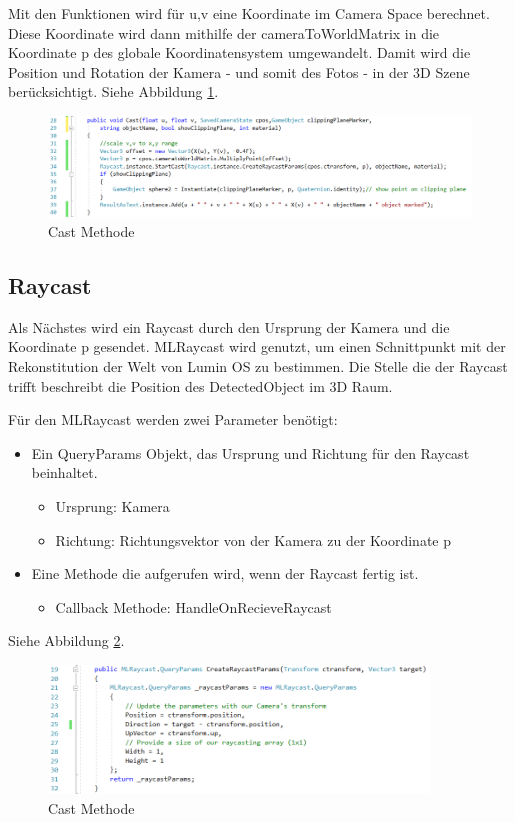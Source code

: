 \documentclass[german,a4paper, 12pt]{llncs}
\begin{document}
Mit den Funktionen wird für u,v eine Koordinate im Camera Space berechnet. Diese Koordinate wird dann mithilfe der cameraToWorldMatrix in die Koordinate p des globale Koordinatensystem umgewandelt. Damit wird die Position und Rotation der Kamera - und somit des Fotos - in der 3D Szene berücksichtigt. Siehe Abbildung \ref{code:castmethod}.

\begin{figure}[H]
	\centering
	\includegraphics[width=1.2\textwidth]{images/code_cast_method.PNG}
	\caption[]{Cast Methode}
	\label{code:castmethod}
\end{figure}
\subsection{Raycast}

Als Nächstes wird ein Raycast durch den Ursprung der Kamera und die Koordinate p gesendet. MLRaycast wird genutzt, um einen Schnittpunkt mit der Rekonstitution der Welt von Lumin OS zu bestimmen. Die Stelle die der Raycast trifft beschreibt die Position des DetectedObject im 3D Raum.

Für den MLRaycast werden zwei Parameter benötigt:
\begin{itemize}
	\item Ein QueryParams Objekt, das Ursprung und Richtung für den Raycast beinhaltet.
	\begin{itemize}
		\item Ursprung: Kamera
		\item Richtung: Richtungsvektor von der Kamera zu der Koordinate p
	\end{itemize}
	\item Eine Methode die aufgerufen wird, wenn der Raycast fertig ist. 
		\begin{itemize}
		\item Callback Methode: HandleOnRecieveRaycast
	\end{itemize}
\end{itemize}

Siehe Abbildung \ref{code:raycastparams}.

\begin{figure}[H]
	\centering
	\includegraphics[width=0.9\textwidth]{images/code_raycastparams.PNG}
	\caption[]{Cast Methode}
	\label{code:raycastparams}
\end{figure}
\end{document}
